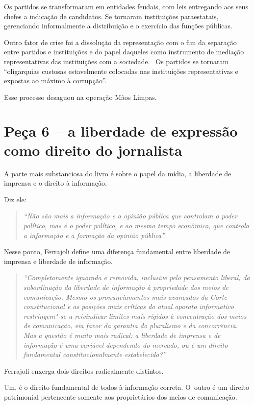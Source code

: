 Os partidos se transformaram em entidades feudais, com leis entregando
aos seus chefes a indicação de candidatos. Se tornaram instituições
paraestatais, gerenciando informalmente a distribuição e o exercício das
funções públicas.

Outro fator de crise foi a dissolução da representação com o fim da
separação entre partidos e instituições e do papel daqueles como
instrumento de mediação representativas das instituições com a
sociedade.~ Os partidos se tornaram ``oligarquias custosas estavelmente
colocadas nas instituições representativas e expostas ao máximo à
corrupção''.

Esse processo desaguou na operação Mãos Limpas.~

\section{Peça 6 -- a liberdade de expressão como direito do jornalista}

A parte mais substanciosa do livro é sobre o papel da mídia, a liberdade
de imprensa e o direito à informação.

Diz ele:

\begin{quote}
\emph{``Não são mais a informação e a opinião pública que controlam o
poder político, mas é o poder político, e ao mesmo tempo econômico, que
controla a informação e a formação da opinião pública''.}
\end{quote}

Nesse ponto, Ferrajoli define uma diferença fundamental entre liberdade
de imprensa e liberdade de informação.

\begin{quote}
\emph{``Completamente ignorada e removida, inclusive pelo pensamento
liberal, da subordinação da liberdade de informação à propriedade dos
meios de comunicação. Mesmo os pronunciamentos mais avançados da Corte
constitucional e as posições mais críticas do atual aparato informativo
restringem"-se a reivindicar limites mais rígidos à concentração dos
meios de comunicação, em favor da garantia do pluralismo e da
concorrência. Mas a questão é muito mais radical: a liberdade de
imprensa e de informação é uma variável dependendo do mercado, ou é um
direito fundamental constitucionalmente estabelecido?''}
\end{quote}

Ferrajoli enxerga dois direitos radicalmente distintos.

Um, é o direito fundamental de todos à informação correta. O~outro é um
direito patrimonial pertencente somente aos proprietários dos meios de
comunicação.

